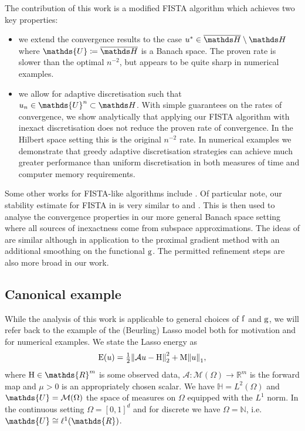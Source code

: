 \documentclass[10pt,a4paper,onecolumn]{article}
\numberwithin{equation}{section}
\let\F\mathds\let\C\mathcal\newcommand{\R}{\F{R}}\newcommand{\A}{\C{A}}
\newcommand{\norm}[1]{{\left\lVert #1 \right\rVert}}
\newcommand{\op}[1]{\operatorname{#1}}\newcommand{\overtext}[2]{\stackrel{\text{#1}}{#2}}
\renewcommand{\bar}{\overline}\renewcommand{\hat}{\widehat}\renewcommand{\tilde}{\widetilde}
\newcommand*{\Func}[1]{%
	\IfEqCase{#1}{%
		{0}{\op{E}}%
		{1}{\op{F}}%
		{2}{\op{G}}%
		{3}{\op{H}}%
	}[\op{F}#1]%
}
\newcommand*{\func}[1]{%
	\IfEqCase{#1}{%
		{0}{\op{e}}%
		{1}{\op{f}}%
		{2}{\op{g}}%
		{3}{\op{h}}%
	}[\op{f}#1]%
}
\newcommand*{\varf}[1]{%
	\IfEqCase{#1}{%
		{0}{u}%
		{1}{v}%
		{2}{w}%
	}[u#1]%
}
\newcommand*{\spcf}[1]{%
	\IfEqCase{#1}{%
		{0}{\F{U}}%
		{1}{\F{V}}%
		{2}{\F{W}}%
	}[\F{U}#1]%
}
\newcommand{\Domain}{\Omega}
\begin{document}
The contribution of this work is a modified FISTA algorithm which achieves two key properties:
\begin{itemize}
	\item we extend the convergence results to the case $\varf0^*\in\bar{\F H}\setminus\F H$ where $\spcf0\coloneqq \bar{\F H}$ is a Banach space. The proven rate is slower than the optimal $n^{-2}$, but appears to be quite sharp in numerical examples.
	\item we allow for adaptive discretisation such that $\varf0_n\in\spcf0^n\subset\F H$. With simple guarantees on the rates of convergence, we show analytically that applying our FISTA algorithm with inexact discretisation does not reduce the proven rate of convergence. In the Hilbert space setting this is the original $n^{-2}$ rate. In numerical examples we demonstrate that greedy adaptive discretisation strategies can achieve much greater performance than uniform discretisation in both measures of time and computer memory requirements.
\end{itemize}
 Some other works for FISTA-like algorithms include \citep{Jiang2012,Villa2013}. Of particular note, our stability estimate for FISTA  in  is very similar to \cite[Proposition 2]{Schmidt2011} and \cite[Proposition 3.3]{Aujol2015}. This is then used to analyse the convergence properties in our more general Banach space setting where all sources of inexactness come from subspace approximations. The ideas of \citet{Parpas2017} are similar although in application to the proximal gradient method with an additional smoothing on the functional $\func2$. The permitted refinement steps are also more broad in our work.

\subsection{Canonical example}
While the analysis of this work is applicable to general choices of $\func1$ and $\func2$, we will refer back to the example of the (Beurling) Lasso model both for motivation and for numerical examples. We state the Lasso energy as
\begin{equation}\label{eq: Lasso energy intro}
	\Func0(\varf0) = \tfrac12\norm{\A\varf0-\vdata0}_2^2 + \mu\norm{\varf0}_1,
\end{equation}
where $\vdata0\in\R^m$ is some observed data, $\A\colon \C M(\Domain)\to \R^m$ is the forward map and $\mu>0$ is an appropriately chosen scalar. We have $\F H = L^2(\Domain)$ and $\spcf0 = \C M(\Domain)$ the space of measures on $\Domain$ equipped with the $L^1$ norm. In the continuous setting $\Domain = [0,1]^d$ and for discrete we have $\Domain=\F N$, i.e. $\spcf0\cong\ell^1(\R)$.
\end{document}
